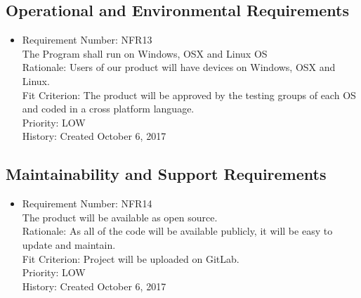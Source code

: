 \documentclass[12pt, titlepage]{article}
\begin{document}
\subsection{Operational and Environmental Requirements}
\begin{itemize}
	\item Requirement Number: NFR13\\
The Program shall run on Windows, OSX and Linux OS\\
Rationale: Users of our product will have devices on Windows, OSX and Linux.\\
Fit Criterion: The product will be approved by the testing groups of each OS and coded in a cross platform language.\\
Priority: LOW\\
History: Created October 6, 2017

\end{itemize}

\subsection{Maintainability and Support Requirements}
\begin{itemize}
	\item Requirement Number: NFR14\\
The product will be available as open source.\\
Rationale: As all of the code will be available publicly, it will be easy to update and maintain.\\
Fit Criterion: Project will be uploaded on GitLab.\\
Priority: LOW\\
History: Created October 6, 2017
\end{itemize}
\end{document}
